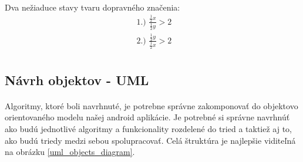 \documentclass[12pt]{article}
\begin{document}
\paragraph{}
Dva nežiaduce stavy tvaru dopravného značenia:
\begin{align*}
		  \text{ 1.) }
          \frac{\frac{1}{2} x}{\frac{1}{2} y} > 2  \\
          \text{ 2.) }
          \frac{\frac{1}{2} y}{\frac{1}{2} x} > 2  \\
\end{align*}
\subsection{Návrh objektov - UML}
\paragraph{}
Algoritmy, ktoré boli navrhnuté, je potrebne správne zakomponovať do objektovo orientovaného modelu našej android aplikácie.
Je potrebné si správne navrhnúť ako budú jednotlivé algoritmy a funkcionality rozdelené do tried a taktiež aj to, ako budú triedy medzi sebou spolupracovať.
Celá štruktúra je najlepšie viditeľná na obrázku \ref{uml_objects_diagram}.
\end{document}
